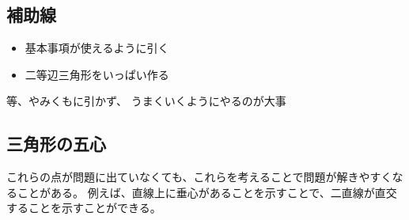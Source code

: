 \documentclass[uplatex,fleqn]{jsbook}
\begin{document}
\subsection{補助線}
\begin{itemize}
    \item 基本事項が使えるように引く
    \item 二等辺三角形をいっぱい作る
\end{itemize}
等、やみくもに引かず、
うまくいくようにやるのが大事

\subsection{三角形の五心}

これらの点が問題に出ていなくても、これらを考えることで問題が解きやすくなることがある。
例えば、直線上に垂心があることを示すことで、二直線が直交することを示すことができる。
\end{document}
